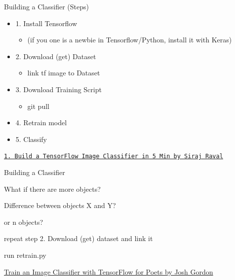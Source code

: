 \documentclass[12pt,t]{beamer}
\begin{document}
\begin{frame}[c]{Building a Classifier (Steps)}

\pause

\begin{itemize}

\item 1. Install Tensorflow 
\pause
\begin{itemize}

\item (if you one is a newbie in Tensorflow/Python, install it with Keras) \pause

\end{itemize}
\item 2. Download (get) Dataset
\pause	
\begin{itemize}

\item	link tf image to Dataset	\pause

\end{itemize}
	
\item 3. Download Training Script
\pause
\begin{itemize}
	
\item	git pull 	\pause

\end{itemize}

\item 4. Retrain model
\pause

\item 5. Classify
\pause

\end{itemize}

\hfill
{\footnotesize \lolit
\href{https://www.youtube.com/watch?v=QfNvhPx5Px8}{\tt 1. Build a TensorFlow Image Classifier in 5 Min by Siraj Raval}
}	
	
\end{frame}
 
\begin{frame}[c]{Building a Classifier}

\pause

What if there are more objects?
\pause

Difference between objects  X and Y?
\pause

or n objects?
\pause

repeat step 2. Download (get) dataset and link it
\pause

run retrain.py
\pause

\hfill
{\footnotesize \lolit
\href{https://www.youtube.com/watch?v=cSKfRcEDGUs}{Train an Image Classifier with TensorFlow for Poets by Josh Gordon}
}	


\end{frame}
\end{document}

